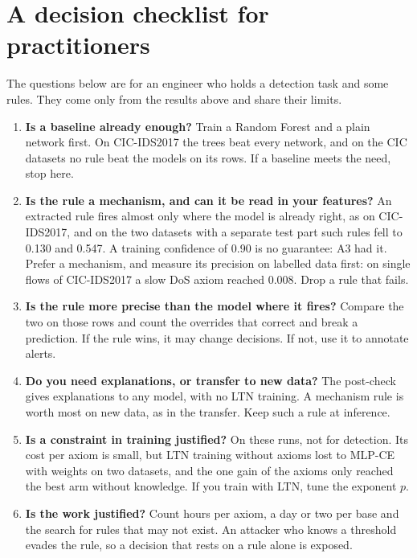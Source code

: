\section{A decision checklist for practitioners}
\label{sec:conc-checklist}

The questions below are for an engineer who holds a detection task and some rules. They come only
from the results above and share their limits.

\begin{enumerate}
  \item \textbf{Is a baseline already enough?} Train a Random Forest and a plain network first. On
    CIC-IDS2017 the trees beat every network, and on the CIC datasets no rule beat the models on its
    rows. If a baseline meets the need, stop here.
  \item \textbf{Is the rule a mechanism, and can it be read in your features?} An extracted rule
    fires almost only where the model is already right, as on CIC-IDS2017, and on the two datasets
    with a separate test part such rules fell to 0.130 and 0.547. A training confidence of 0.90 is no
    guarantee: A3 had it. Prefer a mechanism, and measure its precision on labelled data first: on
    single flows of CIC-IDS2017 a slow DoS axiom reached 0.008. Drop a rule that fails.
  \item \textbf{Is the rule more precise than the model where it fires?} Compare the two on those
    rows and count the overrides that correct and break a prediction. If the rule wins, it may change
    decisions. If not, use it to annotate alerts.
  \item \textbf{Do you need explanations, or transfer to new data?} The post-check gives
    explanations to any model, with no LTN training. A mechanism rule is worth most on new data, as
    in the transfer. Keep such a rule at inference.
  \item \textbf{Is a constraint in training justified?} On these runs, not for detection. Its cost
    per axiom is small, but LTN training without axioms lost to MLP-CE with
    weights on two datasets, and the one gain of the axioms only reached the best arm without
    knowledge. If you train with LTN, tune the exponent $p$.
  \item \textbf{Is the work justified?} Count hours per axiom, a day or two per base and the search
    for rules that may not exist. An attacker who knows a threshold evades the rule, so a decision
    that rests on a rule alone is exposed.
\end{enumerate}

